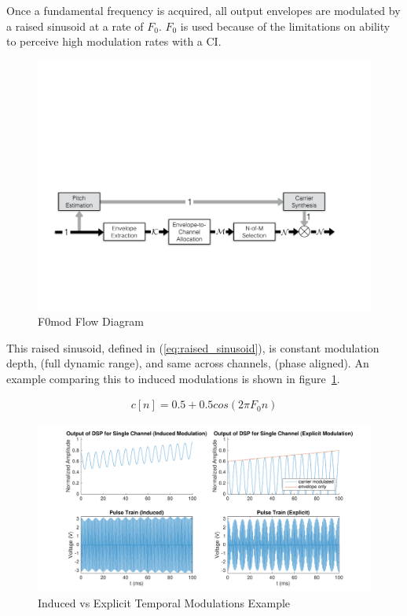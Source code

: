 \documentclass [11pt, proquest,oneside] {ganter_thesis}[2015/03/03]
\begin{document}
Once a fundamental frequency is acquired, all output envelopes are modulated by a raised sinusoid at a rate of $F_0$.  $F_0$ is used because of the limitations on ability to perceive high modulation rates with a CI.

\begin{figure}[!ht]
  \centering
    \includegraphics[width=1\textwidth]{F0mod_flow_diagram}   
    \caption{F0mod Flow Diagram}
\end{figure}

This raised sinusoid, defined in (\ref{eq:raised_sinusoid}), is constant modulation depth, (full dynamic range), and same across channels, (phase aligned).  An example comparing this to induced modulations is shown in figure~\ref{fig:induced_vs_explicit}.

\begin{align}
\label{eq:raised_sinusoid}
c[n] = 0.5 + 0.5cos(2\pi F_0n)
\end{align}

\begin{figure}[!ht]
  \centering
    \includegraphics[width=1\textwidth]{matlab/induced_vs_explicit}   
    \caption{Induced vs Explicit Temporal Modulations Example}\label{fig:induced_vs_explicit}
\end{figure}
\end{document}
